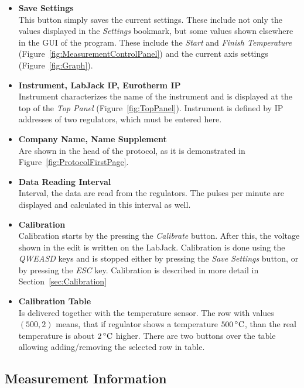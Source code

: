\documentclass[a4paper,11pt,oneside]{report}
\theoremstyle{named}
\begin{document}
\begin{itemize}
  \item \textbf{Save Settings} \\
    This button simply saves the current settings. These include not only the
    values displayed in the \textit{Settings} bookmark, but some values shown
    elsewhere in the GUI of the program. These include the \textit{Start} and
    \textit{Finish Temperature} (Figure~\ref{fig:MeasurementControlPanel}) and
    the current axis settings (Figure~\ref{fig:Graph}).
  \item \textbf{Instrument, LabJack IP, Eurotherm IP} \\
    Instrument characterizes the name of the instrument and is displayed at the
    top of the \textit{Top Panel} (Figure~\ref{fig:TopPanel}). Instrument is defined by
    IP addresses of two regulators, which must be entered here.
  \item \textbf{Company Name, Name Supplement} \\
    Are shown in the head of the protocol, as it is demonstrated in 
    Figure~\ref{fig:ProtocolFirstPage}.
  \item \textbf{Data Reading Interval} \\
    Interval, the data are read from the regulators. The pulses per minute are
    displayed and calculated in this interval as well. 
  \item \textbf{Calibration} \\
    Calibration starts by the pressing the \textit{Calibrate} button. After
    this, the voltage shown in the edit is written on the LabJack. Calibration
    is done using the \textit{QWEASD} keys and is stopped either by pressing the
    \textit{Save Settings} button, or by pressing the \textit{ESC} key.
    Calibration is described in more detail in Section~\ref{sec:Calibration}
  \item \textbf{Calibration Table} \\
    Is delivered together with the temperature sensor. The row with values
    $(500,2)$ means, that if regulator shows a temperature $500\,^{\circ}{\rm
    C}$, than the real temperature is about $2\,^{\circ}{\rm C}$ higher. There
    are two buttons over the table allowing adding/removing the selected row in
    table.
\end{itemize}

\subsection{Measurement Information}
\label{sec:MeasurementInformation}
\end{document}
